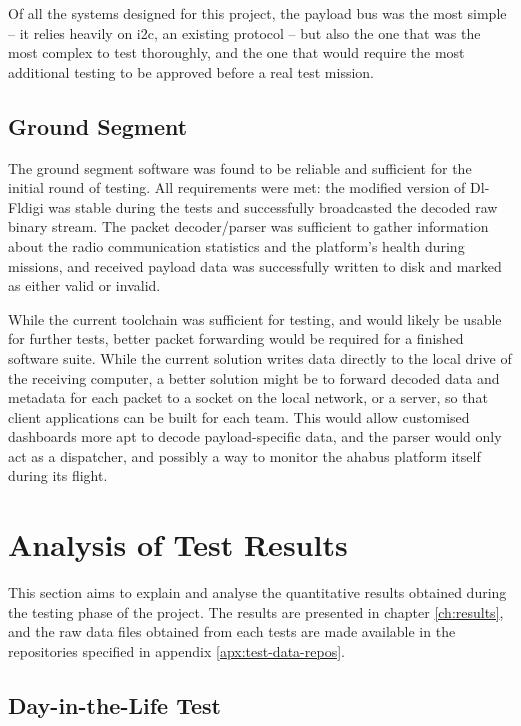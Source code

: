 Of all the systems designed for this project, the payload bus was the most
simple – it relies heavily on \acrshort{i2c}, an existing protocol – but also
the one that was the most complex to test thoroughly, and the one that would
require the most additional testing to be approved before a real test mission.

\subsection{Ground Segment}

The ground segment software was found to be reliable and sufficient for the
initial round of testing. All requirements were met: the modified version of
Dl-Fldigi was stable during the tests and successfully broadcasted the decoded
raw binary stream. The packet decoder/parser was sufficient to gather
information about the radio communication statistics and the platform's health
during missions, and received payload data was successfully written to disk
and marked as either valid or invalid.

While the current toolchain was sufficient for testing, and would likely be
usable for further tests, better packet forwarding would be required for a
finished software suite. While the current solution writes data directly to the
local drive of the receiving computer, a better solution might be to forward
decoded data and metadata for each packet to a socket on the local network, or
a server, so that client applications can be built for each team. This would
allow customised dashboards more apt to decode payload-specific data, and the
parser would only act as a dispatcher, and possibly a way to monitor the
\acrshort{ahabus} platform itself during its flight.

\section{Analysis of Test Results}

This section aims to explain and analyse the quantitative results obtained
during the testing phase of the project. The results are presented in chapter
\ref{ch:results}, and the raw data files obtained from each tests are made available in the repositories specified in appendix \ref{apx:test-data-repos}.

\subsection{Day-in-the-Life Test}

